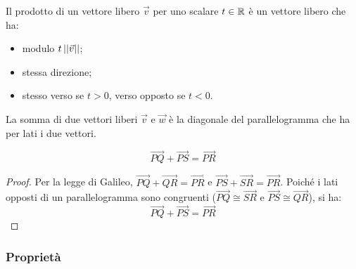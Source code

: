 \begin{definition}
  Il prodotto di un vettore libero $\vec{v}$ per uno scalare $t\in\mathbb{R}$ è un vettore libero che ha:
  \begin{itemize}
    \item modulo $t\left\lvert\left\lvert \vec{v} \right\rvert\right\rvert$;
    \item stessa direzione;
    \item stesso verso se $t>0$, verso opposto se $t<0$.
  \end{itemize}
  \begin{center}
  \end{center}
\end{definition}

\begin{theorem}
  La somma di due vettori liberi $\vec{v}$ e $\vec{w}$ è la diagonale del parallelogramma che ha per lati i due vettori.
  \begin{center}
  \end{center}
  $$\vec{PQ}+\vec{PS}=\vec{PR}$$
\end{theorem}
\begin{proof}
  Per la legge di Galileo, $\vec{PQ}+\vec{QR}=\vec{PR}$ e $\vec{PS}+\vec{SR}=\vec{PR}$. Poiché i lati opposti di un parallelogramma sono congruenti ($\vec{PQ}\cong\vec{SR}$ e $\vec{PS}\cong\vec{QR}$), si ha:
  $$\vec{PQ}+\vec{PS}=\vec{PR}$$
\end{proof}

\subsubsection*{Proprietà}


